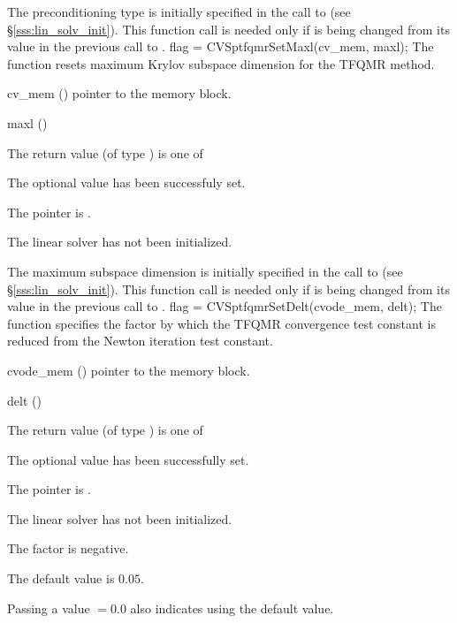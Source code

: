 {
  The preconditioning type is initially specified in the call
  to  (see \S\ref{sss:lin_solv_init}). This function call is
  needed only if  is being changed from its value in the
  previous call to .
}
{
  flag = CVSptfqmrSetMaxl(cv\_mem, maxl);
}
{
  The function  resets maximum Krylov subspace
  dimension for the TFQMR method.
}
{
  \begin{args}[cv\_mem]
  \item[cv\_mem] ()
    pointer to the {\cvodes} memory block.
  \item[maxl] ()

  \end{args}
}
{
  The return value  (of type ) is one of
  \begin{args}
  \item[\Id{CVSPTFQMR\_SUCCESS}] 
    The optional value has been successfuly set.
  \item[\Id{CVSPTFQMR\_MEM\_NULL}]
    The  pointer is .
  \item[\Id{CVSPTFQMR\_LMEM\_NULL}]
    The {\cvsptfqmr} linear solver has not been initialized.
  \end{args}
}
{
  The maximum subspace dimension is initially specified in the call
  to  (see \S\ref{sss:lin_solv_init}). This function call is
  needed only if  is being changed from its value in the
  previous call to .
}
{
  flag = CVSptfqmrSetDelt(cvode\_mem, delt);
}
{
  The function  specifies the factor by
  which the TFQMR convergence test constant is reduced
  from the Newton iteration test constant.
}
{
  \begin{args}
  \item[cvode\_mem] ()
    pointer to the {\cvodes} memory block.
  \item[delt] ()

  \end{args}
}
{
  The return value  (of type ) is one of
  \begin{args}
  \item[\Id{CVSPTFQMR\_SUCCESS}] 
    The optional value has been successfully set.
  \item[\Id{CVSPTFQMR\_MEM\_NULL}]
    The  pointer is .
  \item[\Id{CVSPTFQMR\_LMEM\_NULL}]
    The {\cvsptfqmr} linear solver has not been initialized.
  \item[\Id{CVSPTFQMR\_ILL\_INPUT}]
    The factor  is negative.  
  \end{args}
}
{
  The default value is $0.05$.

  Passing a value $ = 0.0$ also indicates using the default value.
}



